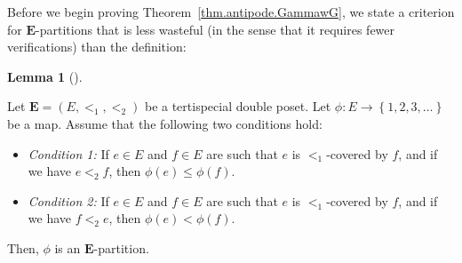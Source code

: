 \documentclass[numbers=enddot,12pt,final,onecolumn,notitlepage,abstracton]{scrartcl}%
\theoremstyle{definition}
\newtheorem{lem}[theo]{Lemma}
\newenvironment{lemma}[1][]
{\begin{lem}[#1]\begin{leftbar}}
{\end{leftbar}\end{lem}}
\newcommand{\EE}{{\mathbf{E}}}
\begin{document}
Before we begin proving Theorem~\ref{thm.antipode.GammawG}, we state a
criterion for $\EE$-partitions that is less wasteful (in the sense that
it requires fewer verifications) than the definition:

\begin{lemma}
\label{lem.Epartition.cover}
Let $\EE = \left(E, <_1, <_2\right)$ be a tertispecial double poset.
Let $\phi : E \to \left\{1, 2, 3, \ldots\right\}$ be a map. Assume
that the following two conditions hold:

\begin{itemize}

\item \textit{Condition 1:} If $e \in E$ and $f \in E$ are such that
$e$ is $<_1$-covered by $f$, and if we have $e <_2 f$, then
$\phi\left(e\right) \leq \phi\left(f\right)$.

\item \textit{Condition 2:} If $e \in E$ and $f \in E$ are such that
$e$ is $<_1$-covered by $f$, and if we have $f <_2 e$, then
$\phi\left(e\right) < \phi\left(f\right)$.

\end{itemize}

Then, $\phi$ is an $\EE$-partition.
\end{lemma}
\end{document}
